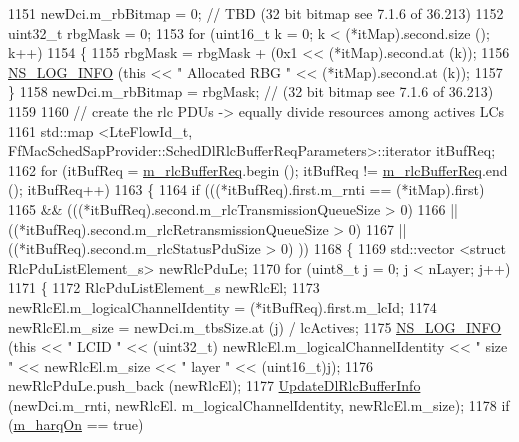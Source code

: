 \begin{DoxyCode}
1151       newDci.m\_rbBitmap = 0; \textcolor{comment}{// TBD (32 bit bitmap see 7.1.6 of 36.213)}
1152       uint32\_t rbgMask = 0;
1153       \textcolor{keywordflow}{for} (uint16\_t k = 0; k < (*itMap).second.size (); k++)
1154         \{
1155           rbgMask = rbgMask + (0x1 << (*itMap).second.at (k));
1156           \hyperlink{group__logging_gafbd73ee2cf9f26b319f49086d8e860fb}{NS\_LOG\_INFO} (\textcolor{keyword}{this} << \textcolor{stringliteral}{" Allocated RBG "} << (*itMap).second.at (k));
1157         \}
1158       newDci.m\_rbBitmap = rbgMask; \textcolor{comment}{// (32 bit bitmap see 7.1.6 of 36.213)}
1159 
1160       \textcolor{comment}{// create the rlc PDUs -> equally divide resources among actives LCs}
1161       std::map <LteFlowId\_t, FfMacSchedSapProvider::SchedDlRlcBufferReqParameters>::iterator itBufReq;
1162       \textcolor{keywordflow}{for} (itBufReq = \hyperlink{classns3_1_1TdMtFfMacScheduler_a274915411679d20f822c11e4c8d61e22}{m\_rlcBufferReq}.begin (); itBufReq != 
      \hyperlink{classns3_1_1TdMtFfMacScheduler_a274915411679d20f822c11e4c8d61e22}{m\_rlcBufferReq}.end (); itBufReq++)
1163         \{
1164           \textcolor{keywordflow}{if} (((*itBufReq).first.m\_rnti == (*itMap).first)
1165               && (((*itBufReq).second.m\_rlcTransmissionQueueSize > 0)
1166                   || ((*itBufReq).second.m\_rlcRetransmissionQueueSize > 0)
1167                   || ((*itBufReq).second.m\_rlcStatusPduSize > 0) ))
1168             \{
1169               std::vector <struct RlcPduListElement\_s> newRlcPduLe;
1170               \textcolor{keywordflow}{for} (uint8\_t j = 0; j < nLayer; j++)
1171                 \{
1172                   RlcPduListElement\_s newRlcEl;
1173                   newRlcEl.m\_logicalChannelIdentity = (*itBufReq).first.m\_lcId;
1174                   newRlcEl.m\_size = newDci.m\_tbsSize.at (j) / lcActives;
1175                   \hyperlink{group__logging_gafbd73ee2cf9f26b319f49086d8e860fb}{NS\_LOG\_INFO} (\textcolor{keyword}{this} << \textcolor{stringliteral}{" LCID "} << (uint32\_t) newRlcEl.m\_logicalChannelIdentity 
      << \textcolor{stringliteral}{" size "} << newRlcEl.m\_size << \textcolor{stringliteral}{" layer "} << (uint16\_t)j);
1176                   newRlcPduLe.push\_back (newRlcEl);
1177                   \hyperlink{classns3_1_1TdMtFfMacScheduler_a89a646ee3be17fcb61ab77b08e11fe07}{UpdateDlRlcBufferInfo} (newDci.m\_rnti, newRlcEl.
      m\_logicalChannelIdentity, newRlcEl.m\_size);
1178                   \textcolor{keywordflow}{if} (\hyperlink{classns3_1_1TdMtFfMacScheduler_af0253034544a704cb4d8583fae9377a3}{m\_harqOn} == \textcolor{keyword}{true})

\end{DoxyCode}
